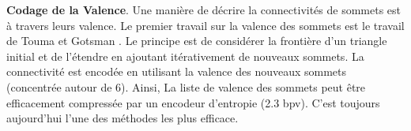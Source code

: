 \documentclass[a4paper,11pt,openany]{article}
\begin{document}
\noindent
\textbf{Codage de la Valence}. Une manière de décrire la connectivités de sommets est à travers leurs valence. Le premier travail sur la valence des sommets est le travail de Touma et Gotsman \cite{valence_encoding}. Le principe est de considérer la frontière d'un triangle initial et de l'étendre en ajoutant itérativement de nouveaux sommets. La connectivité est encodée en utilisant la valence des nouveaux sommets (concentrée autour de 6). Ainsi, La liste de valence des sommets peut être efficacement compressée par un encodeur d'entropie (2.3 bpv). C'est toujours aujourd'hui l'une des méthodes les plus efficace.
\end{document}
